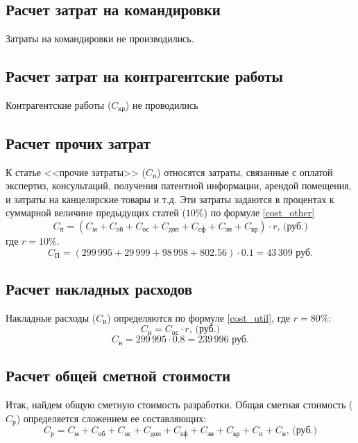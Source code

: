 \subsection{Расчет затрат на командировки}
Затраты на командировки не производились.

\subsection{Расчет затрат на контрагентские работы}
Контрагентские работы ($C_\textit{кр}$) не проводились

\subsection{Расчет прочих затрат}
К статье <<прочие затраты>> ($C_\textit{п}$) относятся затраты, связанные с оплатой экспертиз, консультаций, получения патентной информации, арендой помещения, и затраты на канцелярские товары и т.д. Эти затраты задаются в процентах к суммарной величине предыдущих статей ($10\%$) по формуле \ref{cost_other}
\begin{equation}
	C_\textit{п} = (C_\textit{м}+C_\textit{об}+C_\textit{ос}+C_\textit{доп}+C_\textit{сф}+ C_\textit{эн}+C_\textit{кр})\cdot r \mbox{, (руб.)}
	\label{cost_other}
\end{equation}
где $r=10\%$.
$$
	C_\textit{П} = (299\,995 + 29\,999 + 98\,998 + 802.56)\cdot 0.1 = 43\,309 \mbox{ руб.}
$$

\subsection{Расчет накладных расходов}
Накладные расходы ($C_\textit{н}$) определяются по формуле \ref{cost_util}, где $r = 80\%$:
\begin{equation}
	C_\textit{н} = C_\textit{ос} \cdot r \mbox{, (руб.)}
	\label{cost_util}
\end{equation}
$$
	C_\textit{н} = 299\,995 \cdot 0.8 = 239\,996 \mbox{ руб.}
$$

\subsection{Расчет общей сметной стоимости}
Итак, найдем общую сметную стоимость разработки. Общая сметная стоимость ($C_\textit{р}$) определяется сложением ее составляющих:
\begin{equation}
	C_\textit{р} = C_\textit{м}+C_\textit{об}+C_\textit{ос}+C_\textit{доп}+C_\textit{сф}+ C_\textit{эн}+C_\textit{кр}+C_\textit{п}+C_\textit{н} \mbox{, (руб.)}
\end{equation}


